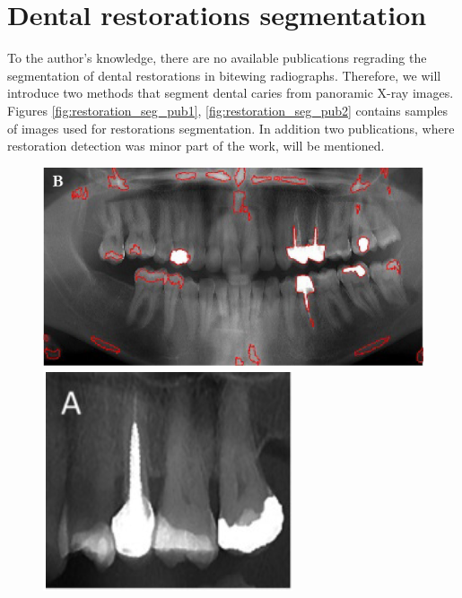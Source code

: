 \section{Dental restorations segmentation}
\label{sec:related_works:dental_restorations}
To the author's knowledge, there are no available publications regrading the segmentation of dental restorations in bitewing radiographs. Therefore, we will introduce two methods that segment dental caries from panoramic X-ray images. Figures \ref{fig:restoration_seg_pub1}, \ref{fig:restoration_seg_pub2} contains samples of images used for restorations segmentation.
In addition two publications, where restoration detection was minor part of the work, will be mentioned.
\begin{figure}
    \begin{floatrow}[2]
        {\includegraphics[width=\linewidth]{images/segmentation_opg.png}}\;
        {\includegraphics[width=\linewidth]{images/segmentation_crop.png}}
    \end{floatrow}
\end{figure}
